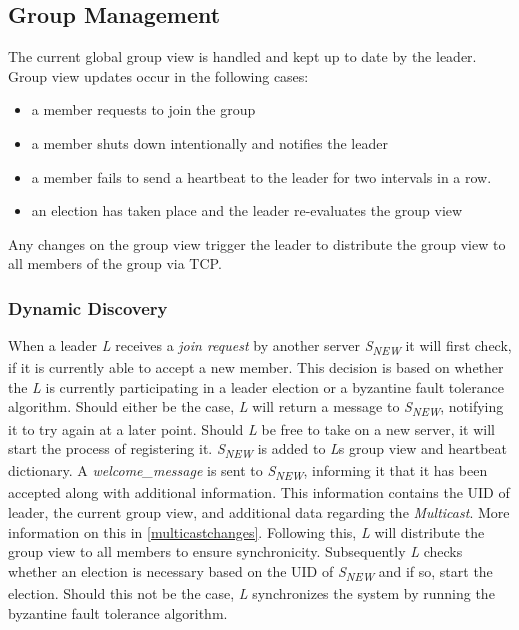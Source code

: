 \documentclass[runningheads]{llncs}
\begin{document}
\subsection{Group Management} \label{grpmngmnt}

The current global group view is handled and kept up to date by the leader. Group view updates occur in the following cases:
\begin{itemize}
    \item a member requests to join the group
    \item a member shuts down intentionally and notifies the leader
    \item a member fails to send a heartbeat to the leader for two intervals in a row.
    \item an election has taken place and the leader re-evaluates the group view
\end{itemize}
Any changes on the group view trigger the leader to distribute the group view to all members of the group via TCP.

\subsubsection{Dynamic Discovery}
When a leader \textit{L} receives a \textit{join request} by another server \textit{S\textsubscript{NEW}} it will first check, if it is currently able to accept a new member. This decision is based on whether the \textit{L} is currently participating in a leader election or a byzantine fault tolerance algorithm. Should either be the case, \textit{L} will return a message to \textit{S\textsubscript{NEW}}, notifying it to try again at a later point. Should \textit{L} be free to take on a new server, it will start the process of registering it. \textit{S\textsubscript{NEW}} is added to \textit{L}s group view and heartbeat dictionary. A \textit{welcome\_message} is sent to \textit{S\textsubscript{NEW}}, informing it that it has been accepted along with additional information. This information contains the UID of leader, the current group view, and additional data regarding the \textit{Multicast}. More information on this in \ref{multicastchanges}. Following this, \textit{L} will distribute the group view to all members to ensure synchronicity. Subsequently \textit{L} checks whether an election is necessary based on the UID of \textit{S\textsubscript{NEW}} and if so, start the election. Should this not be the case, \textit{L} synchronizes the system by running the byzantine fault tolerance algorithm.
\end{document}
